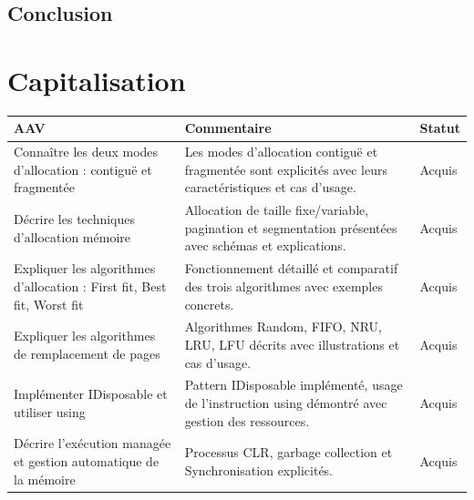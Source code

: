 \subsection*{Conclusion}
{}

\newpage

\section*{Capitalisation}

\begin{center}
\setlength{\tabcolsep}{10pt}

\begin{tabular}{|p{}|p{}|m{}|}
\hline
\textbf{AAV} & \textbf{Commentaire} & \textbf{Statut} \\ \hline

Connaître les deux modes d'allocation : contiguë et fragmentée &
Les modes d'allocation contiguë et fragmentée sont explicités avec leurs caractéristiques et cas d'usage. &
{\color{green!60!black}Acquis} \\ \hline

Décrire les techniques d'allocation mémoire &
Allocation de taille fixe/variable, pagination et segmentation présentées avec schémas et explications. &
{\color{green!60!black}Acquis} \\ \hline

Expliquer les algorithmes d'allocation : First fit, Best fit, Worst fit &
Fonctionnement détaillé et comparatif des trois algorithmes avec exemples concrets. &
{\color{green!60!black}Acquis} \\ \hline

Expliquer les algorithmes de remplacement de pages &
Algorithmes Random, FIFO, NRU, LRU, LFU décrits avec illustrations et cas d'usage. &
{\color{green!60!black}Acquis} \\ \hline

Implémenter IDisposable et utiliser using &
Pattern IDisposable implémenté, usage de l'instruction using démontré avec gestion des ressources. &
{\color{green!60!black}Acquis} \\ \hline

Décrire l'exécution managée et gestion automatique de la mémoire &
Processus CLR, garbage collection et Synchronisation explicités. &
{\color{green!60!black}Acquis} \\ \hline


\end{tabular}
\end{center}
